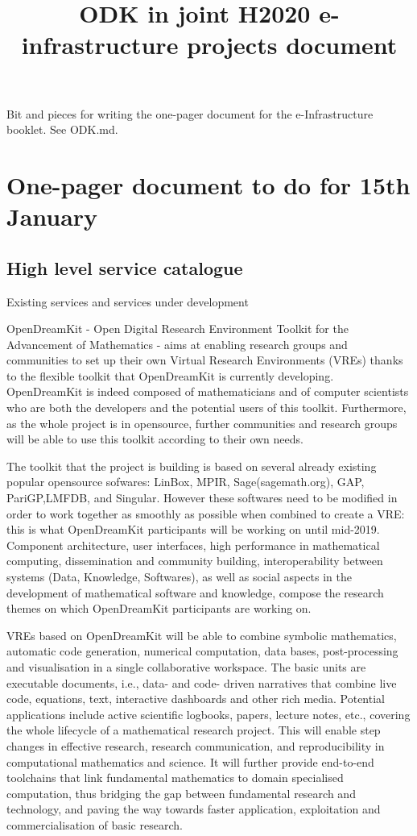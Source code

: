 \documentclass[12pta4wide]{amsart}
\title{ODK in joint H2020 e-infrastructure projects document}
\begin{document}
Bit and pieces for writing the one-pager document for the
e-Infrastructure booklet. See ODK.md.

\section{One-pager document to do for 15th January}
\subsection{High level service catalogue}
Existing services and services under development


OpenDreamKit - Open Digital Research Environment Toolkit for the Advancement of Mathematics - aims at enabling research groups and communities to set up their own Virtual Research Environments (VREs) thanks to the flexible toolkit that OpenDreamKit is currently developing.
OpenDreamKit is indeed composed of mathematicians and of computer scientists who are both the developers and the potential users of this toolkit. Furthermore, as the whole project is in opensource, further communities and research groups will be able to use this toolkit according to their own needs.

The toolkit that the project is building is based on several already existing popular opensource sofwares: LinBox, MPIR, Sage(sagemath.org), GAP, PariGP,LMFDB, and
Singular.
However these softwares need to be modified in order to work together as smoothly as possible when combined to create a VRE: this is what OpenDreamKit participants will be working on until mid-2019. Component architecture, user interfaces, high performance in mathematical computing,  dissemination and community building,  interoperability between systems (Data, Knowledge, Softwares),  as well as social aspects in the development of mathematical software and knowledge, compose the research themes on which OpenDreamKit participants are working on.

VREs based on OpenDreamKit will be able to combine symbolic mathematics, automatic code generation, numerical computation, data bases, post-processing and visualisation in a single collaborative workspace. The basic units are executable documents, i.e., data- and code- driven narratives that combine live code, equations, text, interactive dashboards and other rich media. Potential applications include active scientific logbooks, papers, lecture notes, etc., covering the whole lifecycle of a mathematical research project.
This will enable step changes in effective research, research communication, and reproducibility in computational mathematics and science. It will further provide end-to-end toolchains that link fundamental mathematics to domain specialised computation, thus bridging the gap between fundamental research and technology, and paving the way towards faster application, exploitation and commercialisation of basic research.
\end{document}
